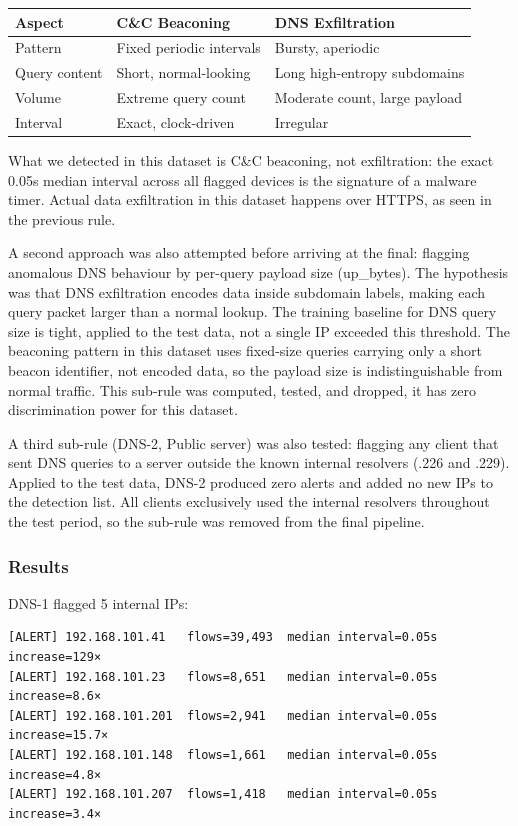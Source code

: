 \documentclass[
  11pt,
]{article}
\begin{document}
\begin{longtable}[]{@{}lll@{}}
\toprule\noalign{}
Aspect & C\&C Beaconing & DNS Exfiltration \\
\midrule\noalign{}
\endhead
\bottomrule\noalign{}
\endlastfoot
Pattern & Fixed periodic intervals & Bursty, aperiodic \\
Query content & Short, normal-looking & Long high-entropy subdomains \\
Volume & Extreme query count & Moderate count, large payload \\
Interval & Exact, clock-driven & Irregular \\
\end{longtable}

What we detected in this dataset is C\&C beaconing, not exfiltration:
the exact 0.05s median interval across all flagged devices is the
signature of a malware timer. Actual data exfiltration in this dataset
happens over HTTPS, as seen in the previous rule.

A second approach was also attempted before arriving at the final:
flagging anomalous DNS behaviour by per-query payload size (up\_bytes).
The hypothesis was that DNS exfiltration encodes data inside subdomain
labels, making each query packet larger than a normal lookup. The
training baseline for DNS query size is tight, applied to the test data,
not a single IP exceeded this threshold. The beaconing pattern in this
dataset uses fixed-size queries carrying only a short beacon identifier,
not encoded data, so the payload size is indistinguishable from normal
traffic. This sub-rule was computed, tested, and dropped, it has zero
discrimination power for this dataset.

A third sub-rule (DNS-2, Public server) was also tested: flagging any
client that sent DNS queries to a server outside the known internal
resolvers (.226 and .229). Applied to the test data, DNS-2 produced zero
alerts and added no new IPs to the detection list. All clients
exclusively used the internal resolvers throughout the test period, so
the sub-rule was removed from the final pipeline.

\subsubsection{Results}



DNS-1 flagged 5 internal IPs:

\begin{verbatim}
[ALERT] 192.168.101.41   flows=39,493  median interval=0.05s  increase=129×
[ALERT] 192.168.101.23   flows=8,651   median interval=0.05s  increase=8.6×
[ALERT] 192.168.101.201  flows=2,941   median interval=0.05s  increase=15.7×
[ALERT] 192.168.101.148  flows=1,661   median interval=0.05s  increase=4.8×
[ALERT] 192.168.101.207  flows=1,418   median interval=0.05s  increase=3.4×
\end{verbatim}
\end{document}
